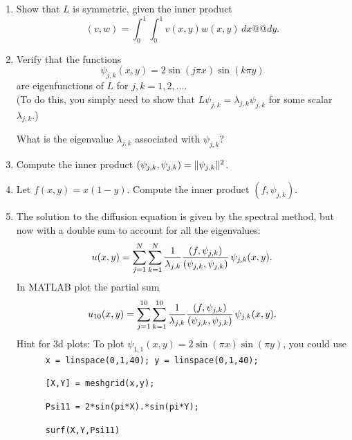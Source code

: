 \begin{enumerate}
\item Show that $L$ is symmetric, given the inner product 
        \[ (v, w) = \int_0^1 \int_0^1 v(x,y) w(x,y) \, dx@@ dy.\]

\vspace*{0.5em}
\item Verify that the functions 
               \[ \psi_{j,k}(x,y) = 2 \sin(j \pi x) \sin(k \pi y)\]
      are eigenfunctions of $L$ for $j,k = 1,2,\ldots.$\\
      (To do this, you simply need to show that $L\psi_{j,k} = \lambda_{j,k} \psi_{j,k}$
       for some scalar $\lambda_{j,k}$.)  
       
       What is the eigenvalue $\lambda_{j,k}$ associated with $\psi_{j,k}$?

\vspace*{0.5em}
\item Compute the inner product $(\psi_{j,k},\psi_{j,k}) = \|\psi_{j,k}\|^2$.

\vspace*{0.5em}
\item Let $f(x,y) = x(1-y)$.  Compute the inner product $(f, \psi_{j,k})$.

\vspace*{0.5em}
\item The solution to the diffusion equation is given by the spectral method, but now with
      a double sum to account for all the eigenvalues:
       \[ u(x,y) = \sum_{j=1}^N \sum_{k=1}^N 
                     {1\over \lambda_{j,k}} {(f,\psi_{j,k}) \over (\psi_{j,k},\psi_{j,k})}\, \psi_{j,k}(x,y).\]
      In MATLAB plot the partial sum
       \[ u_{10}(x,y)= \sum_{j=1}^{10} \sum_{k=1}^{10}
                 {1\over \lambda_{j,k}} {(f,\psi_{j,k}) \over (\psi_{j,k},\psi_{j,k})}\, \psi_{j,k}(x,y).\]
      Hint for 3d plots: To plot 
      $\psi_{1,1}(x,y) = 2 \sin(\pi x)\sin(\pi y)$, you could use\\[0em]

       \ \ \ \ \ \ {\tt x = linspace(0,1,40); y = linspace(0,1,40); }

       \ \ \ \ \ \ {\tt [X,Y] = meshgrid(x,y);}

       \ \ \ \ \ \ {\tt Psi11 = 2*sin(pi*X).*sin(pi*Y);}
       
       \ \ \ \ \ \ {\tt surf(X,Y,Psi11)}

\end{enumerate}



